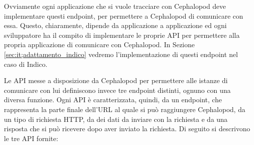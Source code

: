             Ovviamente ogni applicazione che si vuole tracciare con Cephalopod deve implementare questi endpoint, per permettere a Cephalopod di comunicare con essa. Questo, chiaramente, dipende da applicazione a applicazione ed ogni sviluppatore ha il compito di implementare le proprie \ac{API} per permettere alla propria applicazione di comunicare con Cephalopod. In Sezione \ref{sec:it;adattamento_indico} vedremo l'implementazione di questi endpoint nel caso di Indico.
            
            Le \ac{API} messe a disposizione da Cephalopod per permettere alle istanze di comunicare con lui definiscono invece tre endpoint distinti, ognuno con una diversa funzione. Ogni \ac{API} è caratterizzata, quindi, da un endpoint, che rappresenta la parte finale dell'\ac{URL} al quale si può raggiungere Cephalopod, da un tipo di richiesta \ac{HTTP}, da dei dati da inviare con la richiesta e da una risposta che si può ricevere dopo aver inviato la richiesta. Di seguito si descrivono le tre \ac{API} fornite: 
            
